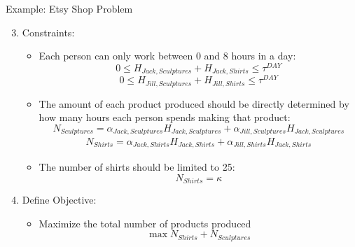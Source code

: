 \documentclass[10pt, aspectratio=169]{beamer}
\begin{document}
\begin{frame}{Example: Etsy Shop Problem}
    \begin{enumerate}
        \setcounter{enumi}{2}
        \item Constraints:
        \begin{itemize}
            \item Each person can only work between 0 and 8 hours in a day:
            $$0 \leq H_{Jack,Sculptures} + H_{Jack,Shirts} \leq \tau^{DAY}$$
            $$0 \leq H_{Jill,Sculptures} + H_{Jill,Shirts} \leq \tau^{DAY}$$
            \item The amount of each product produced should be directly determined by how many hours each person spends making that product:
            $$N_{Sculptures} = \alpha_{Jack,Sculptures} H_{Jack,Sculptures} + \alpha_{Jill,Sculptures} H_{Jack,Sculptures}$$
            \begin{equation}
                \begin{split}
                    N_{Shirts} = \alpha_{Jack,Shirts} H_{Jack,Shirts} + \alpha_{Jill,Shirts} H_{Jack,Shirts}
                \end{split}
                \tag*{}
            \end{equation}
            \item The number of shirts should be limited to 25:
            $$N_{Shirts} = \kappa$$
        \end{itemize}
        \setcounter{enumi}{3}
        \item Define Objective:
        \begin{itemize}
            \item Maximize the total number of products produced
            $$\max N_{Shirts} + N_{Sculptures}$$
        \end{itemize}
    \end{enumerate}
\end{frame}
\end{document}

